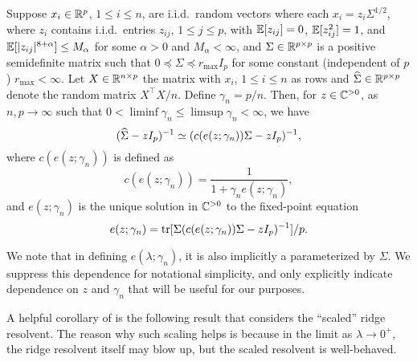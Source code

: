 \documentclass{article}
\begin{document}
\begin{lemma}
    \label{lem:basic-ridge-resolvent-deterministic-equivalent}
    Suppose $x_i \in \mathbb{R}^{p}$, $1 \le i \le n$, are i.i.d.\ random vectors
    where each $x_i = z_i \Sigma^{1/2}$,
    where $z_i$ contains i.i.d.\ entries $z_{ij}$, $1 \le j \le p$,
    with $\mathbb{E}[z_{ij}] = 0$, $\mathbb{E}[z_{ij}^2] = 1$, and $\mathbb{E}[|z_{ij}|^{8+\alpha}] \le M_\alpha$
    for some $\alpha > 0$ and $M_\alpha < \infty$,
    and $\Sigma \in \mathbb{R}^{p \times p}$ is a positive semidefinite matrix
    such that $0 \preceq \Sigma \preceq r_{\max} I_p$
    for some constant
    (independent of $p$)
    $r_{\max} < \infty$.
    Let $X \in \mathbb{R}^{n \times p}$ the matrix with $x_i$, $1 \le i \le n$ as rows
    and ${\widehat{\Sigma}} \in \mathbb{R}^{p \times p}$ denote the random matrix $X^\top X / n$.
    Define $\gamma_n = p / n$.
    Then, 
    for $z \in \mathbb{C}^{> 0}$,
    as $n, p \to \infty$ such that $0 < \liminf \gamma_n \le \limsup \gamma_n < \infty$,
    we have
    \begin{equation}
        ({\widehat{\Sigma}} - z I_p)^{-1}
        \simeq
        (c(e(z; \gamma_n)) \Sigma - z I_p)^{-1},
    \end{equation}
    where
    $c(e(z; \gamma_n))$ is defined as
    \begin{equation}
        \label{eq:basic-ridge-equivalence-c-e-relation}
        c(e(z; \gamma_n))
        = \frac{1}{ 1 + \gamma_n e(z; \gamma_n)},
    \end{equation}
    and $e(z; \gamma_n)$ is the unique solution in $\mathbb{C}^{> 0}$ to the fixed-point equation
    \begin{equation}
        \label{eq:basic-ridge-equivalence-e-fixed-point}
        e(z; \gamma_n)
        = 
        \operatorname{tr}[ \Sigma (c(e(z; \gamma_n)) \Sigma  - z I_p)^{-1} ] / p.
    \end{equation}
\end{lemma}

We note that in defining $e(\lambda; \gamma_n)$,
it is also implicitly a parameterized by $\Sigma$.
We suppress this dependence for notational simplicity,
and only explicitly indicate dependence on 
$z$
and $\gamma_n$
that will be useful for our purposes. 

A helpful corollary of 
is the following result that considers the ``scaled'' ridge resolvent.
The reason why such scaling helps is because
in the limit as $\lambda \to 0^+$,
the ridge resolvent itself may blow up,
but the scaled resolvent is well-behaved.
\end{document}
